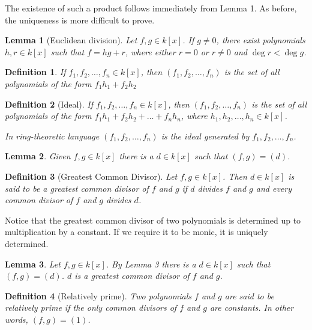 \documentclass{article}
\newtheorem*{definition*}{Definition}
\newtheorem{lemma}{Lemma}
\numberwithin{proposition}{subsection}
\begin{document}
The existence of such a product follows immediately from Lemma 1. As before,
the uniqueness is more difficult to prove.

\begin{lemma}[Euclidean division]
  Let $f, g \in k[x]$. If $g \neq 0$, there exist polynomials $h, r \in k[x]$
  such that $f = hg + r$, where either $r = 0$ or $r \neq 0$ and $\deg r < \deg
  g$.
\end{lemma}

\begin{definition*}
  If $f_1, f_2, \ldots, f_n \in k[x]$, then $(f_1, f_2, \ldots, f_n)$ is the
  set of all polynomials of the form $f_1h_1 + f_2h_2$
\end{definition*}

\begin{definition*}[Ideal]
  If $f_1, f_2, \ldots, f_n \in k[x]$, then $(f_1, f_2, \ldots, f_n)$ is the
  set of all polynomials of the form $f_1h_1 + f_2h_2 + \ldots + f_nh_n$, where
  $h_1, h_2, \ldots, h_n \in k[x]$.

  In ring-theoretic language $(f_1, f_2, \ldots, f_n)$ is the ideal generated
  by $f_1, f_2, \ldots, f_n$.
\end{definition*}

\begin{lemma}
  Given $f, g \in k[x]$ there is a $d \in k[x]$ such that $(f, g) = (d)$.
\end{lemma}

\begin{definition*}[Greatest Common Divisor]
  Let $f, g \in k[x]$. Then $d \in k[x]$ is said to be a \emph{greatest common
  divisor} of $f$ and $g$ if $d$ divides $f$ and $g$ and every common divisor
  of $f$ and $g$ divides $d$.
\end{definition*}

Notice that the greatest common divisor of two polynomials is determined up to
multiplication by a constant. If we require it to be monic, it is uniquely
determined.

\begin{lemma}
  Let $f, g \in k[x]$. By Lemma 3 there is a $d \in k[x]$ such that $(f, g) =
  (d)$. $d$ is a greatest common divisor of $f$ and $g$.
\end{lemma}

\begin{definition*}[Relatively prime]
  Two polynomials $f$ and $g$ are said to be \emph{relatively prime} if the
  only common divisors of $f$ and $g$ are constants. In other words, $(f, g) =
  (1)$.
\end{definition*}
\end{document}
